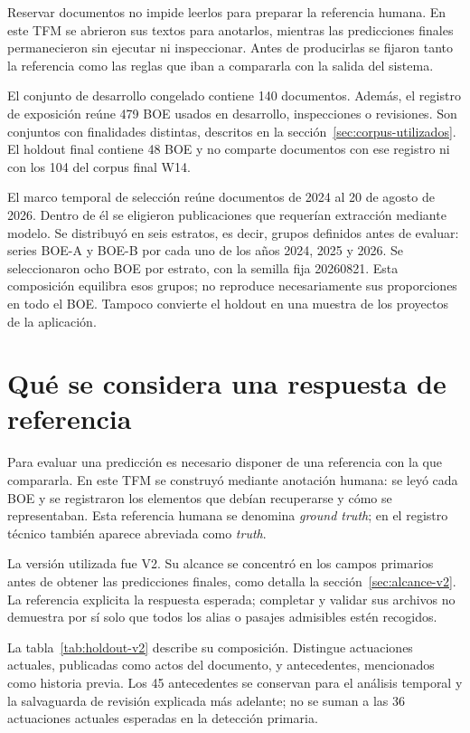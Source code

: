 Reservar documentos no impide leerlos para preparar la referencia humana.
En este TFM se abrieron sus textos para anotarlos, mientras las predicciones
finales permanecieron sin ejecutar ni inspeccionar. Antes de producirlas se
fijaron tanto la referencia como las reglas que iban a compararla con la
salida del sistema.

El conjunto de desarrollo congelado contiene 140 documentos. Además, el
registro de exposición reúne 479 BOE usados en desarrollo, inspecciones o
revisiones. Son conjuntos con finalidades distintas, descritos en la
sección~\ref{sec:corpus-utilizados}. El holdout final contiene 48 BOE y no
comparte documentos con ese registro ni con los 104 del corpus final W14.

El marco temporal de selección reúne documentos de 2024 al 20 de agosto de
2026. Dentro de él se eligieron publicaciones que requerían
extracción mediante modelo. Se distribuyó en seis estratos,
es decir, grupos definidos antes de evaluar: series BOE-A y BOE-B por cada
uno de los años 2024, 2025 y 2026. Se seleccionaron ocho BOE por estrato,
con la semilla fija 20260821. Esta composición equilibra esos grupos;
no reproduce necesariamente sus proporciones en todo el BOE. Tampoco
convierte el holdout en una muestra de los proyectos de la aplicación.

\section{Qué se considera una respuesta de referencia}
Para evaluar una predicción es necesario disponer de una referencia con la
que compararla. En este TFM se construyó mediante anotación humana: se leyó
cada BOE y se registraron los elementos que debían recuperarse y cómo se
representaban. Esta referencia humana se denomina \emph{ground truth}; en
el registro técnico también aparece abreviada como \emph{truth}.

La versión utilizada fue V2. Su alcance se concentró en los campos primarios
antes de obtener las predicciones finales, como detalla la
sección~\ref{sec:alcance-v2}. La referencia explicita la respuesta esperada;
completar y validar sus archivos no demuestra por sí solo que todos los alias
o pasajes admisibles estén recogidos.

La tabla~\ref{tab:holdout-v2} describe su composición. Distingue actuaciones
actuales, publicadas como actos del documento, y antecedentes, mencionados
como historia previa. Los 45 antecedentes se conservan para el análisis
temporal y la salvaguarda de revisión explicada más adelante; no se suman
a las 36 actuaciones actuales esperadas en la detección primaria.

